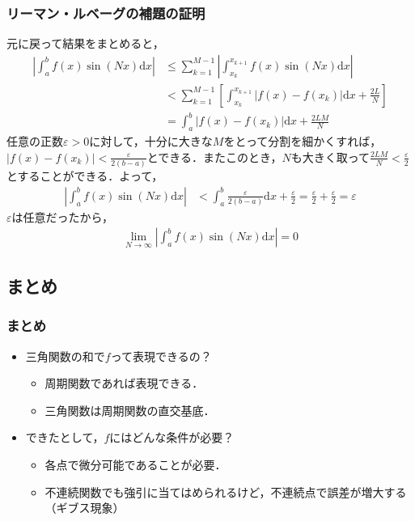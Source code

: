 \documentclass[dvipdfmx,graphicx,14pt]{beamer}
\begin{document}
\begin{frame}[c]
    \frametitle{リーマン・ルベーグの補題の証明}
    \scriptsize
    元に戻って結果をまとめると，
    \begin{align*}
        \left| \int_{a}^{b} f(x) \sin(Nx) \mathrm{d} x \right| &\leq \sum_{k=1}^{M-1} \left| \int_{x_{k}}^{x_{k+1}} f(x) \sin(Nx) \mathrm{d} x \right| \\
        &< \sum_{k=1}^{M-1} \left[ \int_{x_{k}}^{x_{k+1}} | f(x) - f(x_{k}) | \mathrm{d} x +  \frac{2L}{N} \right] \\
        &= \int_{a}^{b} | f(x) - f(x_{k}) | \mathrm{d} x + \frac{2LM}{N}
    \end{align*}
    任意の正数$\varepsilon > 0$に対して，十分に大きな$M$をとって分割を細かくすれば，$| f(x) - f(x_{k}) | < \frac{\varepsilon}{2(b-a)}$とできる．またこのとき，$N$も大きく取って$\frac{2LM}{N} < \frac{\varepsilon}{2}$とすることができる．よって，
    \begin{align*}
        \left| \int_{a}^{b} f(x) \sin(Nx) \mathrm{d} x \right| &< \int_{a}^{b} \frac{\varepsilon}{2(b-a)} \mathrm{d} x + \frac{\varepsilon}{2} = \frac{\varepsilon}{2} + \frac{\varepsilon}{2} = \varepsilon
    \end{align*}
    $\varepsilon$は任意だったから，
    \begin{align*}
        \lim_{N\to\infty} \left| \int_{a}^{b} f(x) \sin(Nx) \mathrm{d} x \right| = 0
    \end{align*}
\end{frame}

\subsection{まとめ}

\begin{frame}[c]
    \frametitle{まとめ}
    \begin{itemize}
        \item 三角関数の和で$f$って表現できるの？
            \begin{itemize}
                \item 周期関数であれば表現できる．
                \item 三角関数は周期関数の直交基底．
            \end{itemize}
        \item できたとして，$f$にはどんな条件が必要？
            \begin{itemize}
                \item 各点で微分可能であることが必要．
                \item 不連続関数でも強引に当てはめられるけど，不連続点で誤差が増大する（ギブス現象）
            \end{itemize}
    \end{itemize}
\end{frame}
\end{document}
